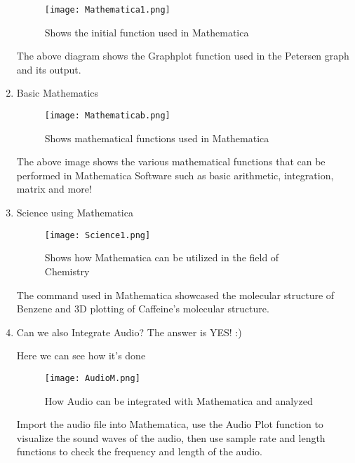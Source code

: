 \documentclass[12pt]{article}
\begin{document}
\begin{enumerate}
\begin{itemize}
\end{itemize}

\begin{figure}[H]
    \centering
    \texttt{[image: Mathematica1.png]}
    \caption{Shows the initial function used in Mathematica}
    \label{fig:mathematica_function}
\end{figure}

The above diagram shows the Graphplot function used in the Petersen graph and its output.

\item Basic Mathematics 

\begin{figure}[H]
    \centering
    \texttt{[image: Mathematicab.png]}
    \caption{Shows mathematical functions used in Mathematica}
    \label{fig:mathematica_math_functions}
\end{figure}

The above image shows the various mathematical functions that can be performed in Mathematica Software such as basic arithmetic, integration, matrix and more!

\item Science using Mathematica

\begin{figure}[H]
    \centering
    \texttt{[image: Science1.png]}
    \caption{Shows how Mathematica can be utilized in the field of Chemistry} 
    \label{fig:mathematica_science}
\end{figure}

The command used in Mathematica showcased the molecular structure of Benzene and 3D plotting of Caffeine's molecular structure. 

\newpage
  
\item Can we also Integrate Audio? The answer is YES! :)
  
Here we can see how it's done
  
\begin{figure}[H]
    \centering
    \texttt{[image: AudioM.png]}
    \caption{How Audio can be integrated with Mathematica and analyzed} 
    \label{fig:mathematica_audio}
\end{figure}

Import the audio file into Mathematica, use the Audio Plot function to visualize the sound waves of the audio, then use sample rate and length functions to check the frequency and length of the audio. 

\end{enumerate}
\end{document}
